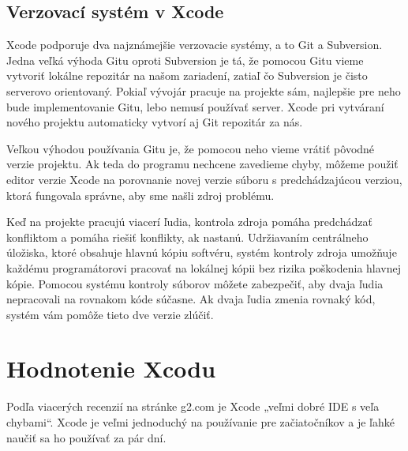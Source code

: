 \documentclass[12pt]{article}
\begin{document}
		\subsection{Verzovací systém v Xcode}
			Xcode podporuje dva najznámejšie verzovacie systémy,  a to Git a Subversion.  Jedna veľká výhoda Gitu oproti Subversion je tá,  že pomocou Gitu vieme vytvoriť lokálne repozitár na našom zariadení,  zatiaľ čo Subversion je čisto serverovo orientovaný.  Pokiaľ vývojár pracuje na projekte sám,  najlepšie pre neho bude implementovanie Gitu,  lebo nemusí používať server.  Xcode pri vytváraní nového projektu automaticky vytvorí aj Git repozitár za nás.  \cite{xcodevcs} \par
			Veľkou výhodou používania Gitu je, že pomocou neho vieme vrátiť pôvodné verzie projektu. Ak teda do programu nechcene zavedieme chyby, môžeme použiť editor verzie Xcode na porovnanie novej verzie súboru s predchádzajúcou verziou, ktorá fungovala správne, aby sme našli zdroj problému. \par
			Keď na projekte pracujú viacerí ľudia, kontrola zdroja pomáha predchádzať konfliktom a pomáha riešiť konflikty, ak nastanú. Udržiavaním centrálneho úložiska, ktoré obsahuje hlavnú kópiu softvéru, systém kontroly zdroja umožňuje každému programátorovi pracovať na lokálnej kópii bez rizika poškodenia hlavnej kópie. Pomocou systému kontroly súborov môžete zabezpečiť, aby dvaja ľudia nepracovali na rovnakom kóde súčasne. Ak dvaja ľudia zmenia rovnaký kód, systém vám pomôže tieto dve verzie zlúčiť.

	\newpage
		\section{Hodnotenie Xcodu}
			Podľa viacerých recenzií na stránke g2.com \cite{g2xreviews} je Xcode „veľmi dobré IDE s veľa chybami“.  Xcode je veľmi jednoduchý na používanie pre začiatočníkov a je ľahké naučiť sa ho používať za pár dní.
\end{document}
